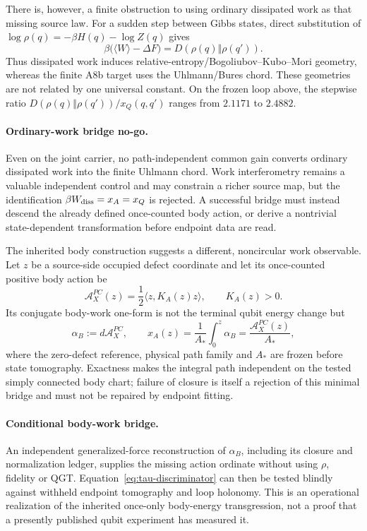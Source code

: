 There is, however, a finite obstruction to using ordinary dissipated work as
that missing source law. For a sudden step between Gibbs states, direct
substitution of $\log\rho(q)=-\beta H(q)-\log Z(q)$ gives
\begin{equation}
 \beta\bigl(\langle W\rangle-\Delta F\bigr)
 =D\!\left(\rho(q)\Vert\rho(q')\right).
 \label{eq:dissipated-work-relative-entropy}
\end{equation}
Thus dissipated work induces relative-entropy/Bogoliubov--Kubo--Mori
geometry, whereas the finite A8b target uses the Uhlmann/Bures chord. These
geometries are not related by one universal constant. On the frozen loop
above, the stepwise ratio
$D(\rho(q)\Vert\rho(q'))/x_Q(q,q')$ ranges from $2.1171$ to $2.4882$.

\paragraph{Ordinary-work bridge no-go.}
Even on the joint carrier, no path-independent common gain converts ordinary
dissipated work into the finite Uhlmann chord. Work interferometry remains a
valuable independent control and may constrain a richer source map, but the
identification $\beta W_{\rm diss}=x_A=x_Q$ is rejected. A successful bridge
must instead descend the already defined once-counted body action, or derive
a nontrivial state-dependent transformation before endpoint data are read.

The inherited body construction suggests a different, noncircular work
observable. Let $z$ be a source-side occupied defect coordinate and let its
once-counted positive body action be
\begin{equation}
 \mathcal A_X^{PC}(z)
 =\frac12\langle z,K_A(z)z\rangle,
 \qquad K_A(z)>0.
 \label{eq:body-action-potential}
\end{equation}
Its conjugate body-work one-form is not the terminal qubit energy change but
\begin{equation}
 \alpha_B:=d\mathcal A_X^{PC},
 \qquad
 x_A(z)=\frac{1}{A_*}\int_{0}^{z}\alpha_B
       =\frac{\mathcal A_X^{PC}(z)}{A_*},
 \label{eq:body-work-transgression}
\end{equation}
where the zero-defect reference, physical path family and $A_*$ are frozen
before state tomography. Exactness makes the integral path independent on the
tested simply connected body chart; failure of closure is itself a rejection
of this minimal bridge and must not be repaired by endpoint fitting.

\paragraph{Conditional body-work bridge.}
An independent generalized-force reconstruction of $\alpha_B$, including its
closure and normalization ledger, supplies the missing action ordinate without
using $\rho$, fidelity or QGT. Equation~\eqref{eq:tau-discriminator} can then
be tested blindly against withheld endpoint tomography and loop holonomy. This
is an operational realization of the inherited once-only body-energy
transgression, not a proof that a presently published qubit experiment has
measured it.


